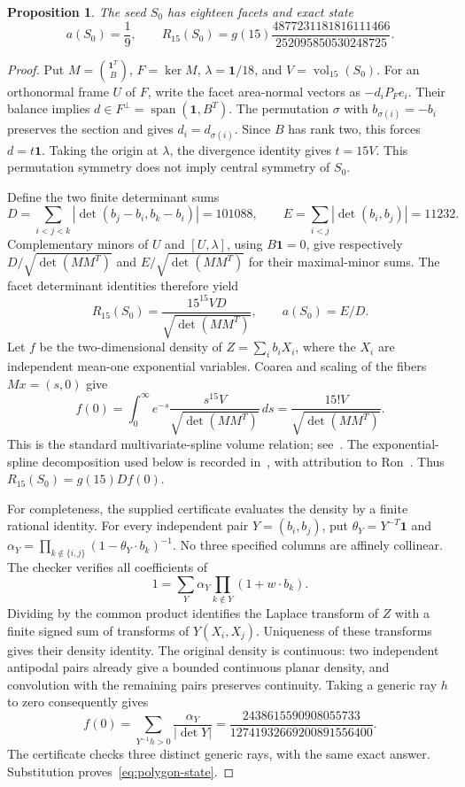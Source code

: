 \documentclass[11pt]{article}
\newtheorem{proposition}[theorem]{Proposition}
\DeclareMathOperator{\vol}{vol}
\begin{document}
\begin{proposition}\label{prop:polygon}
The seed $S_0$ has eighteen facets and exact state
\begin{equation}\label{eq:polygon-state}
 a(S_0)=\frac19,\qquad
 R_{15}(S_0)=g(15)\frac{4877231181816111466}{252095850530248725}.
\end{equation}
\end{proposition}
\begin{proof}
Put $M=\binom{\boldsymbol1^T}{B}$, $F=\ker M$, $\lambda=\boldsymbol1/18$,
and $V=\vol_{15}(S_0)$. For an orthonormal frame $U$ of $F$, write the
facet area-normal vectors as $-d_iP_Fe_i$. Their balance implies
$d\in F^\perp=\operatorname{span}(\boldsymbol1,B^T)$.
The permutation $\sigma$ with $b_{\sigma(i)}=-b_i$ preserves the
section and gives $d_i=d_{\sigma(i)}$. Since $B$ has rank two, this forces
$d=t\boldsymbol1$. Taking the origin at $\lambda$, the divergence
identity gives $t=15V$. This permutation symmetry does not imply central
symmetry of $S_0$.

Define the two finite determinant sums
\[
 D=\sum_{i<j<k}|\det(b_j-b_i,b_k-b_i)|=101088,\qquad
 E=\sum_{i<j}|\det(b_i,b_j)|=11232.
\]
Complementary minors of $U$ and $[U,\lambda]$, using $B\boldsymbol1=0$,
give respectively $D/\sqrt{\det(MM^T)}$ and
$E/\sqrt{\det(MM^T)}$ for their maximal-minor sums.
The facet determinant identities therefore yield
\[
 R_{15}(S_0)=\frac{15^{15}VD}{\sqrt{\det(MM^T)}},\qquad a(S_0)=E/D.
\]
Let $f$ be the two-dimensional density of
$Z=\sum_i b_iX_i$, where the $X_i$ are independent mean-one exponential
variables. Coarea and scaling of the fibers $Mx=(s,0)$ give
\[
 f(0)=\int_0^\infty e^{-s}
                \frac{s^{15}V}{\sqrt{\det(MM^T)}}\,ds
      =\frac{15!V}{\sqrt{\det(MM^T)}}.
\]
This is the standard multivariate-spline volume relation;
see~\cite[Section 3, equation (3.2)]{xu}. The exponential-spline
decomposition used below is recorded in~\cite[Lemma 3.1]{xu},
with attribution to Ron~\cite{ron}.
Thus $R_{15}(S_0)=g(15)Df(0)$.

For completeness, the supplied certificate evaluates the density by a
finite rational identity. For every independent pair $Y=(b_i,b_j)$, put
$\theta_Y=Y^{-T}\boldsymbol1$ and
$\alpha_Y=\prod_{k\notin\{i,j\}}(1-\theta_Y\cdot b_k)^{-1}$.
No three specified columns are affinely collinear. The checker verifies
all coefficients of
\begin{equation}\label{eq:polygon-laplace}
 1=\sum_Y\alpha_Y\prod_{k\notin Y}(1+w\cdot b_k).
\end{equation}
Dividing by the common product identifies the Laplace transform of $Z$
with a finite signed sum of transforms of $Y(X_i,X_j)$.
Uniqueness of these transforms gives their density identity.
The original density is continuous: two independent antipodal pairs
already give a bounded continuous planar density, and convolution with
the remaining pairs preserves continuity. Taking a generic ray $h$ to
zero consequently gives
\[
 f(0)=\sum_{Y^{-1}h>0}\frac{\alpha_Y}{|\det Y|}
     =\frac{2438615590908055733}{12741932669200891556400}.
\]
The certificate checks three distinct generic rays, with the same exact
answer. Substitution proves~\eqref{eq:polygon-state}.
\end{proof}
\end{document}
